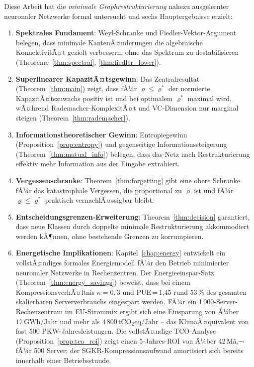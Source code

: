 ﻿\documentclass[12pt, a4paper, openany]{report}
\begin{document}
Diese Arbeit hat die \emph{minimale Graphrestrukturierung} nahezu
ausgelernter neuronaler Netzwerke formal untersucht und sechs Hauptergebnisse
erzielt:

\begin{enumerate}
  \item \textbf{Spektrales Fundament}: Weyl-Schranke und Fiedler-Vektor-Argument
    belegen, dass minimale KantenÃ¤nderungen die algebraische KonnektivitÃ¤t
    gezielt verbessern, ohne das Spektrum zu destabilisieren
    (Theoreme~\ref{thm:spectral}, \ref{thm:fiedler_lower}).

  \item \textbf{Superlinearer KapazitÃ¤tsgewinn}: Das Zentralresultat
    (Theorem~\ref{thm:main}) zeigt, dass fÃ¼r $\varrho \leq \varrho^*$
    der normierte KapazitÃ¤tszuwachs positiv ist und bei optimalem $\varrho^*$
    maximal wird, wÃ¤hrend Rademacher-KomplexitÃ¤t und VC-Dimension nur
    marginal steigen (Theorem~\ref{thm:rademacher}).

  \item \textbf{Informationstheoretischer Gewinn}: Entropiegewinn
    (Proposition~\ref{prop:entropy}) und gegenseitige Informationssteigerung
    (Theorem~\ref{thm:mutual_info}) belegen, dass das Netz nach
    Restrukturierung effektiv mehr Information aus der Eingabe extrahiert.

  \item \textbf{Vergessenschranke}: Theorem~\ref{thm:forgetting} gibt
    eine obere Schranke fÃ¼r das katastrophale Vergessen, die proportional
    zu $\varrho$ ist und fÃ¼r $\varrho \leq \varrho^*$ praktisch
    vernachlÃ¤ssigbar bleibt.

  \item \textbf{Entscheidungsgrenzen-Erweiterung}: Theorem~\ref{thm:decision}
    garantiert, dass neue Klassen durch doppelte minimale Restrukturierung
    akkommodiert werden kÃ¶nnen, ohne bestehende Grenzen zu korrumpieren.

  \item \textbf{Energetische Implikationen}: Kapitel~\ref{chap:energy}
    entwickelt ein vollstÃ¤ndiges formales Energiemodell fÃ¼r den Betrieb
    minimierter neuronaler Netzwerke in Rechenzentren.  Der
    Energieeinspar-Satz (Theorem~\ref{thm:energy_savings}) beweist, dass
    bei einem KompressionsverhÃ¤ltnis $\kappa = 0{,}3$ und PUE\,=\,1{,}45
    rund $53\,\%$ des gesamten skalierbaren Serververbrauchs eingespart
    werden.  FÃ¼r ein 1\,000-Server-Rechenzentrum im EU-Strommix ergibt sich
    eine Einsparung von Ã¼ber $17\,\mathrm{GWh/Jahr}$ und mehr als
    $4\,800\,\mathrm{tCO_2eq/Jahr}$ -- das KlimaÃ¤quivalent von fast
    500 PKW-Jahresleistungen.  Die vollstÃ¤ndige TCO-Analyse
    (Proposition~\ref{prop:tco_roi}) zeigt einen 5-Jahres-ROI von Ã¼ber
    42\,Mâ‚¬ fÃ¼r 500 Server; der SGKR-Kompressionsaufwand amortisiert sich
    bereits innerhalb einer Betriebsstunde.
\end{enumerate}
\end{document}
